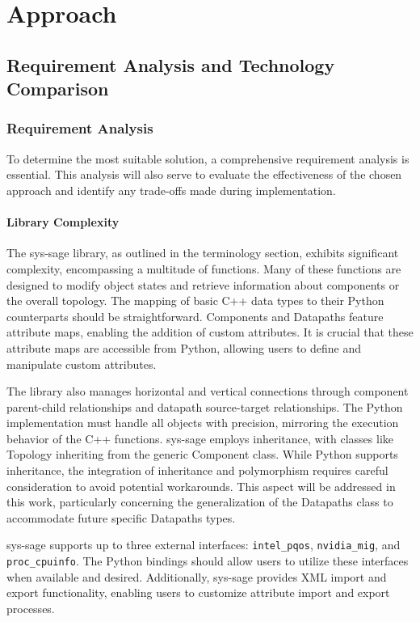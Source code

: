\chapter{Approach}\label{chapter:Approach}
\section{Requirement Analysis and Technology Comparison}

\subsection{Requirement Analysis}

To determine the most suitable solution, a comprehensive requirement analysis is essential. This analysis will also serve to evaluate the effectiveness of the chosen approach and identify any trade-offs made during implementation.

\subsubsection{Library Complexity}

The sys-sage library, as outlined in the terminology section, exhibits significant complexity, encompassing a multitude of functions. Many of these functions are designed to modify object states and retrieve information about components or the overall topology. The mapping of basic C++ data types to their Python counterparts should be straightforward. Components and Datapaths feature attribute maps, enabling the addition of custom attributes. It is crucial that these attribute maps are accessible from Python, allowing users to define and manipulate custom attributes.

The library also manages horizontal and vertical connections through component parent-child relationships and datapath source-target relationships. The Python implementation must handle all objects with precision, mirroring the execution behavior of the C++ functions. sys-sage employs inheritance, with classes like Topology inheriting from the generic Component class. While Python supports inheritance, the integration of inheritance and polymorphism requires careful consideration to avoid potential workarounds. This aspect will be addressed in this work, particularly concerning the generalization of the Datapaths class to accommodate future specific Datapaths types.

sys-sage supports up to three external interfaces: \verb|intel_pqos|, \verb|nvidia_mig|, and \verb|proc_cpuinfo|. The Python bindings should allow users to utilize these interfaces when available and desired. Additionally, sys-sage provides XML import and export functionality, enabling users to customize attribute import and export processes.

